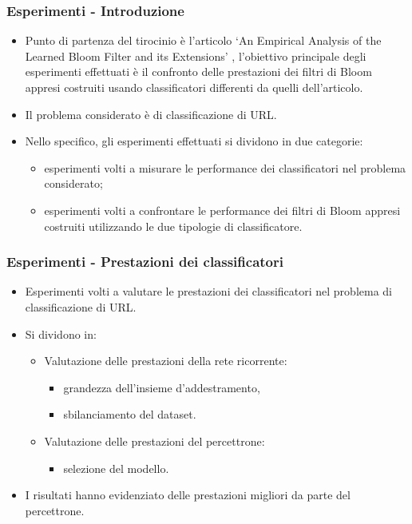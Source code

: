 \documentclass{beamer}
\begin{document}
\begin{frame}
\frametitle{Esperimenti - Introduzione}
    \begin{itemize}
        \item Punto di partenza del tirocinio è l'articolo `An Empirical Analysis of the Learned Bloom Filter and its Extensions' \cite{ma2020}, l'obiettivo principale degli esperimenti effettuati è il confronto delle prestazioni dei filtri di Bloom appresi costruiti usando classificatori differenti da quelli dell'articolo.
        \item Il problema considerato è di classificazione di URL.
        \item Nello specifico, gli esperimenti effettuati si dividono in due categorie:
        \begin{itemize}
            \item esperimenti volti a misurare le performance dei classificatori nel problema considerato;
            \item esperimenti volti a confrontare le performance dei filtri di Bloom appresi costruiti utilizzando le due tipologie di classificatore.
        \end{itemize}
    \end{itemize}
\end{frame}

\begin{frame}
\frametitle{Esperimenti - Prestazioni dei classificatori}

\begin{itemize}
    \item Esperimenti volti a valutare le prestazioni dei classificatori nel problema di classificazione di URL.
    \item Si dividono in:
    \begin{itemize}
        \item Valutazione delle prestazioni della rete ricorrente:
        \begin{itemize}
            \item grandezza dell'insieme d'addestramento,
            \item sbilanciamento del dataset.
        \end{itemize}
        \item Valutazione delle prestazioni del percettrone: 
        \begin{itemize}
            \item selezione del modello.
        \end{itemize}
    \end{itemize}
    \item I risultati hanno evidenziato delle prestazioni migliori da parte del percettrone.
\end{itemize}
\end{frame}
\end{document}
